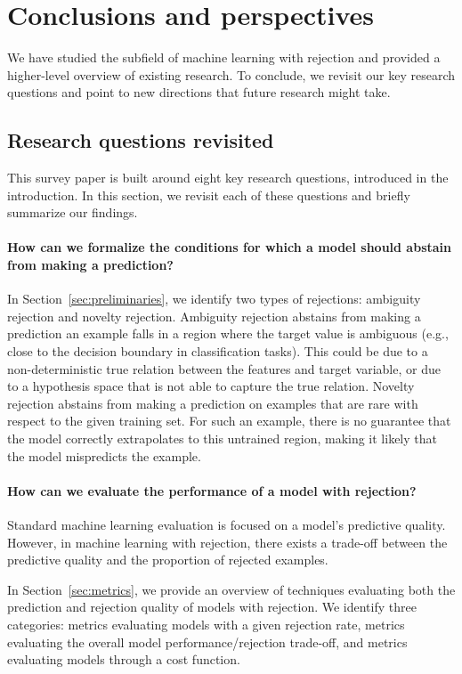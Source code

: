 \section{Conclusions and perspectives}\label{sec:conclusion_and_future_direction}

We have studied the subfield of machine learning with rejection and provided a higher-level overview of existing research. To conclude, we revisit our key research questions and point to new directions that future research might take.

\subsection{Research questions revisited}
This survey paper is built around eight key research questions, introduced in the introduction. In this section, we revisit each of these questions and briefly summarize our findings.

\paragraph{How can we formalize the conditions for which a model should abstain from making a prediction?}
In Section~\ref{sec:preliminaries}, we identify two types of rejections: ambiguity rejection and novelty rejection.
Ambiguity rejection abstains from making a prediction an example falls in a region where the target value is ambiguous (e.g., close to the decision boundary in classification tasks).
This could be due to a non-deterministic true relation between the features and target variable, or due to a hypothesis space that is not able to capture the true relation. 
Novelty rejection abstains from making a prediction on examples that are rare with respect to the given training set. For such an example, there is no guarantee that the model correctly extrapolates to this untrained region, making it likely that the model mispredicts the example.

\paragraph{How can we evaluate the performance of a model with rejection?}
Standard machine learning evaluation is focused on a model's predictive quality. However, in machine learning with rejection, there exists a trade-off between the predictive quality and the proportion of rejected examples.

In Section~\ref{sec:metrics}, we provide an overview of techniques evaluating both the prediction and rejection quality of models with rejection. We identify three categories: metrics evaluating models with a given rejection rate, metrics evaluating the overall model performance/rejection trade-off, and metrics evaluating models through a cost function.

